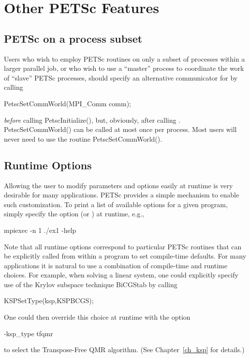 {{%
\cleardoublepage
\chapter{Other PETSc Features}

\section{PETSc on a process subset}

Users who wish to employ PETSc routines on only a subset
of processes within a larger parallel job, or who wish to use a
``master'' process to coordinate the work of ``slave'' PETSc
processes, should specify an alternative communicator for  by calling
\begin{tabbing}
  PetscSetCommWorld(MPI\_Comm comm);
\end{tabbing}
{\em before} calling PetscInitialize(), but, obviously, after
calling . PetscSetCommWorld() can be called
at most once per process. Most users will never need to use the routine
PetscSetCommWorld().

\section{Runtime Options}  
\label{sec_options}

Allowing the user to modify parameters and options easily at runtime
is very desirable for many applications.  PETSc provides a simple
mechanism to enable such customization.  To print a list of
available options for a given program, simply specify the option
 (or ) at runtime, e.g.,  
\begin{tabbing}
    mpiexec -n 1 ./ex1 -help
\end{tabbing}

Note that all runtime options correspond to particular PETSc routines
that can be explicitly called from within a program to set compile-time
defaults.   For many applications it is natural to use a combination
of compile-time and runtime choices.  For example, when solving a linear
system, one could explicitly specify use of the Krylov subspace
technique BiCGStab by calling
\begin{tabbing}
   KSPSetType(ksp,KSPBCGS);
\end{tabbing}
One could then override this choice at runtime with the option
\begin{tabbing}
    -ksp\_type tfqmr
\end{tabbing}
to select the Transpose-Free QMR algorithm. (See Chapter~\ref{ch_ksp} for details.)

}}
